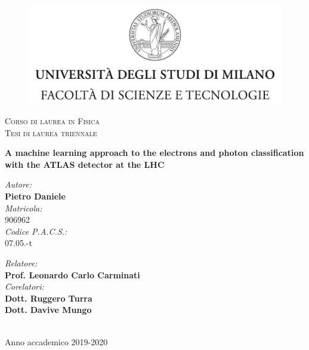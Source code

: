 \documentclass[a4paper, oneside]{book}
\begin{document}
	\begin{titlepage}
		\begin{figure}
			\includegraphics[width=\linewidth]{tesi_images/logo.jpg}
		\end{figure}
		\center
		\textsc{\large Corso di laurea in Fisica}\\[0.2cm]
		\textsc{\normalsize Tesi di laurea triennale}\\[2cm]
		
		\begin{doublespace}
			\textbf{\LARGE A machine learning approach to the electrons and photon classification with the ATLAS detector at the LHC}
			\\[2cm]
		\end{doublespace}
		
		\begin{minipage}{0.4\textwidth}
			\begin{flushleft}
				\emph{Autore:} \\[0mm]
				\textbf{Pietro Daniele} \\[4mm]
				\emph{Matricola:}\\
				906962 \\[4mm]
				\emph{Codice P.A.C.S.:}\\[0mm]
				07.05.-t
			\end{flushleft}
		\end{minipage}
		\begin{minipage}{0.4\textwidth}
			\begin{flushright} 
				\emph{Relatore:} \\
				\textbf{Prof. Leonardo Carlo Carminati} \\[1.2em]
				\emph{Corelatori:} \\
				\textbf{Dott. Ruggero Turra} \\
				\textbf{Dott. Davive Mungo} \\[1.2em]
			\end{flushright}
		\end{minipage}\\[2cm]
		\vfill
		Anno accademico 2019-2020
		
	\end{titlepage}
\end{document}
